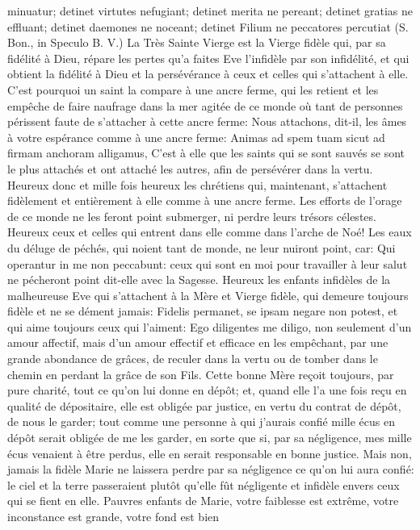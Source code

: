 minuatur; detinet virtutes nefugiant; detinet merita ne pereant; detinet gratias ne effluant; detinet daemones ne
noceant; detinet Filium ne peccatores percutiat (S. Bon., in Speculo B. V.)
 La Très Sainte Vierge est la Vierge fidèle qui, par sa fidélité à Dieu, répare les pertes qu'a faites Eve l'infidèle
par son infidélité, et qui obtient la fidélité à Dieu et la persévérance à ceux et celles qui s'attachent à elle. C'est
pourquoi un saint la compare à une ancre ferme, qui les retient et les empêche de faire naufrage dans la mer
agitée de ce monde où tant de personnes périssent faute de s'attacher à cette ancre ferme: Nous attachons, dit-il,
les âmes à votre espérance comme à une ancre ferme: Animas ad spem tuam sicut ad firmam anchoram
alligamus, C'est à elle que les saints qui se sont sauvés se sont le plus attachés et ont attaché les autres, afin de
persévérer dans la vertu. Heureux donc et mille fois heureux les chrétiens qui, maintenant, s'attachent fidèlement
et entièrement à elle comme à une ancre ferme. Les efforts de l'orage de ce monde ne les feront point submerger,
ni perdre leurs trésors célestes. Heureux ceux et celles qui entrent dans elle comme dans l'arche de Noé! Les
eaux du déluge de péchés, qui noient tant de monde, ne leur nuiront point, car: Qui operantur in me non
peccabunt: ceux qui sont en moi pour travailler à leur salut ne pécheront point dit-elle avec la Sagesse. Heureux
les enfants infidèles de la malheureuse Eve qui s'attachent à la Mère et Vierge fidèle, qui demeure toujours fidèle
et ne se dément jamais: Fidelis permanet, se ipsam negare non potest, et qui aime toujours ceux qui l'aiment: Ego
diligentes me diligo, non seulement d'un amour affectif, mais d'un amour effectif et efficace en les empêchant, par
une grande abondance de grâces, de reculer dans la vertu ou de tomber dans le chemin en perdant la grâce de
son Fils.
 Cette bonne Mère reçoit toujours, par pure charité, tout ce qu'on lui donne en dépôt; et, quand elle l'a une
fois reçu en qualité de dépositaire, elle est obligée par justice, en vertu du contrat de dépôt, de nous le garder; tout
comme une personne à qui j'aurais confié mille écus en dépôt serait obligée de me les garder, en sorte que si, par
sa négligence, mes mille écus venaient à être perdus, elle en serait responsable en bonne justice. Mais non,
jamais la fidèle Marie ne laissera perdre par sa négligence ce qu'on lui aura confié: le ciel et la terre passeraient
plutôt qu'elle fût négligente et infidèle envers ceux qui se fient en elle.
 Pauvres enfants de Marie, votre faiblesse est extrême, votre inconstance est grande, votre fond est bien
